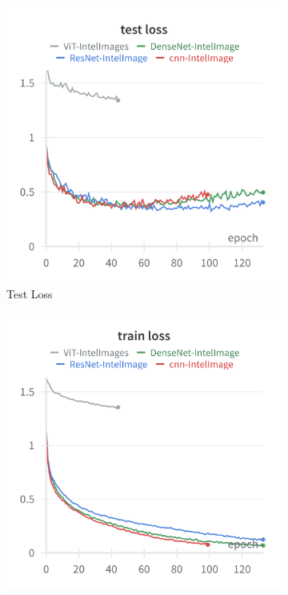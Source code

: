 \documentclass[twocolumn,superscriptaddress,aps]{revtex4-1}
\begin{document}
\begin{figure}[H]
    \centering
    \begin{subfigure}{0.235 \textwidth}
        \includegraphics[width = 0.99 \textwidth]{images/IntelImage_test.png}
        \caption{Test Loss}
    \end{subfigure}
    \begin{subfigure}{0.235 \textwidth}
        \includegraphics[width = 0.99 \textwidth]{images/IntelImage_train.png}

\end{subfigure}
\end{figure}
\end{document}
